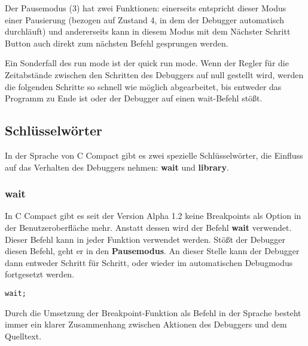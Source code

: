 
Der Pausemodus (3) hat zwei Funktionen: einerseits entspricht dieser Modus einer Pausierung (bezogen auf Zustand 4, in dem der Debugger automatisch durchläuft) und andererseits kann in diesem Modus mit dem \glqq{}Nächster Schritt\grqq{} Button auch direkt zum nächsten Befehl gesprungen werden.

Ein Sonderfall des run mode ist der \glqq{}quick run mode\grqq{}. Wenn der Regler für die Zeitabstände zwischen den Schritten des Debuggers auf null gestellt wird, werden die folgenden Schritte so schnell wie möglich abgearbeitet, bis entweder das Programm zu Ende ist oder der Debugger auf einen \glqq{}wait\grqq{}-Befehl stößt.


\subsection{Schlüsselwörter}
In der Sprache von C Compact gibt es zwei spezielle Schlüsselwörter, die Einfluss auf das Verhalten des Debuggers nehmen: \textbf{wait} und \textbf{library}.

\subsubsection*{wait}
In C Compact gibt es seit der Version Alpha 1.2 keine Breakpoints als Option in der Benutzeroberfläche mehr. Anstatt dessen wird der Befehl \textbf{wait} verwendet. Dieser Befehl kann in jeder Funktion verwendet werden. Stößt der Debugger diesen Befehl, geht er in den \textbf{Pausemodus}. An dieser Stelle kann der Debugger dann entweder Schritt für Schritt, oder wieder im automatischen Debugmodus fortgesetzt werden.

\begin{lstlisting}[language=CMM]
wait;
\end{lstlisting}

Durch die Umsetzung der Breakpoint-Funktion als Befehl in der Sprache besteht immer ein klarer Zusammenhang zwischen Aktionen des Debuggers und dem Quelltext.

